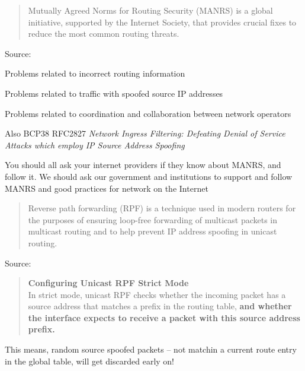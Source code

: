 \documentclass[Screen16to9,17pt]{foils}
\begin{document}
\begin{quote}
  Mutually Agreed Norms for Routing Security (MANRS) is a global initiative, supported by the Internet Society, that provides crucial fixes to reduce the most common routing threats. ﻿
\end{quote}
Source: {\small{}}

\begin{list2}
\item Problems related to incorrect routing information
\item Problems related to traffic with spoofed source IP addresses
\item Problems related to coordination and collaboration between network operators
\item Also BCP38 RFC2827 \emph{Network Ingress Filtering: Defeating Denial of Service Attacks
which employ IP Source Address Spoofing}
\end{list2}

You should all ask your internet providers if they know about MANRS, and follow it. We should ask our government and institutions to support and follow MANRS and good practices for network on the Internet



\begin{quote}
Reverse path forwarding (RPF) is a technique used in modern routers for the purposes of ensuring loop-free forwarding of multicast packets in multicast routing and to help prevent IP address spoofing in unicast routing.
\end{quote}
Source: 

\begin{quote}
{\bf Configuring Unicast RPF Strict Mode}\\
In strict mode, unicast RPF checks whether the incoming packet has a source address that matches a prefix in the routing table, {\bf and whether the interface expects to receive a packet with this source address prefix.}
\end{quote}

This means, random source spoofed packets -- not matchin a current route entry in the global table, will get discarded early on!


\end{document}
